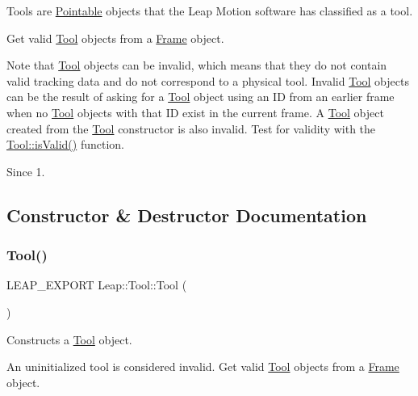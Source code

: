 Tools are \hyperlink{class_leap_1_1_pointable}{Pointable} objects that the Leap Motion software has classified as a tool.

Get valid \hyperlink{class_leap_1_1_tool}{Tool} objects from a \hyperlink{class_leap_1_1_frame}{Frame} object.



Note that \hyperlink{class_leap_1_1_tool}{Tool} objects can be invalid, which means that they do not contain valid tracking data and do not correspond to a physical tool. Invalid \hyperlink{class_leap_1_1_tool}{Tool} objects can be the result of asking for a \hyperlink{class_leap_1_1_tool}{Tool} object using an ID from an earlier frame when no \hyperlink{class_leap_1_1_tool}{Tool} objects with that ID exist in the current frame. A \hyperlink{class_leap_1_1_tool}{Tool} object created from the \hyperlink{class_leap_1_1_tool}{Tool} constructor is also invalid. Test for validity with the \hyperlink{class_leap_1_1_pointable_afe50d02eb1b4f554a4089c329fda1a45}{Tool\+::is\+Valid()} function. \begin{DoxySince}{Since}
1. 
\end{DoxySince}


\subsection{Constructor \& Destructor Documentation}
\mbox{\label{class_leap_1_1_tool_a6debbdfc14096362bf32228ba3e5c72f}} 
\subsubsection{\texorpdfstring{Tool()}{Tool()}\hspace{0.1cm}{\footnotesize\ttfamily [1/2]}}
{\footnotesize\ttfamily L\+E\+A\+P\+\_\+\+E\+X\+P\+O\+RT Leap\+::\+Tool\+::\+Tool (\begin{DoxyParamCaption}{ }\end{DoxyParamCaption})}

Constructs a \hyperlink{class_leap_1_1_tool}{Tool} object.

An uninitialized tool is considered invalid. Get valid \hyperlink{class_leap_1_1_tool}{Tool} objects from a \hyperlink{class_leap_1_1_frame}{Frame} object.


\begin{DoxyCodeInclude}
\end{DoxyCodeInclude}


